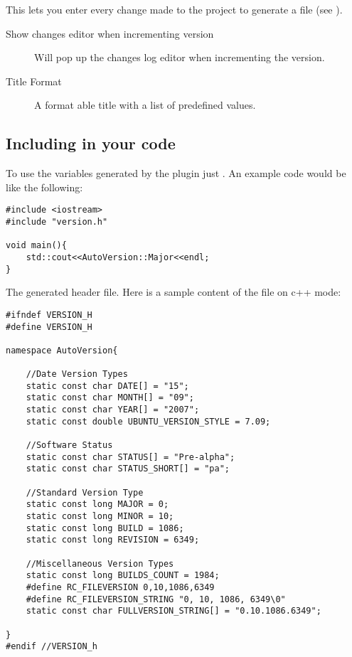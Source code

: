 
This lets you enter every change made to the project to generate a  file (see ).


\begin{description}
\item[Show changes editor when incrementing version] Will pop up the changes log editor when incrementing the version.
\item[Title Format] A format able title with a list of predefined values.
\end{description}

\subsection{Including in your code}

To use the variables generated by the plugin just . An example code would be like the following:

\begin{lstlisting}
#include <iostream>
#include "version.h"

void main(){
    std::cout<<AutoVersion::Major<<endl;
}
\end{lstlisting}


The generated header file. Here is a sample content of the file on c++ mode:

\begin{lstlisting}
#ifndef VERSION_H
#define VERSION_H

namespace AutoVersion{

	//Date Version Types
	static const char DATE[] = "15";
	static const char MONTH[] = "09";
	static const char YEAR[] = "2007";
	static const double UBUNTU_VERSION_STYLE = 7.09;

	//Software Status
	static const char STATUS[] = "Pre-alpha";
	static const char STATUS_SHORT[] = "pa";

	//Standard Version Type
	static const long MAJOR = 0;
	static const long MINOR = 10;
	static const long BUILD = 1086;
	static const long REVISION = 6349;

	//Miscellaneous Version Types
	static const long BUILDS_COUNT = 1984;
	#define RC_FILEVERSION 0,10,1086,6349
	#define RC_FILEVERSION_STRING "0, 10, 1086, 6349\0"
	static const char FULLVERSION_STRING[] = "0.10.1086.6349";

}
#endif //VERSION_h
\end{lstlisting}

